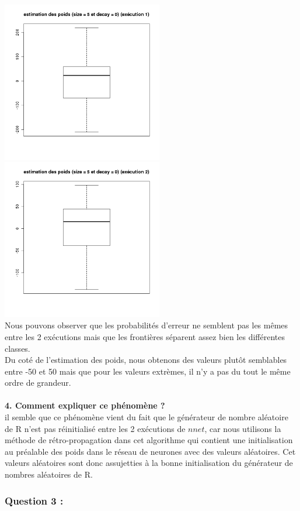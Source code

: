 \documentclass[a4paper, 10pt]{article}
\begin{document}
\includegraphics[height = 7cm, width = 7cm]{plots/poids_q2_2_3.png}
\includegraphics[height = 7cm, width = 7cm]{plots/poids_q2_3_2.png}\\
Nous pouvons observer que les probabilités d'erreur ne semblent pas les mêmes entre les 2 exécutions mais que les frontières séparent assez bien les différentes classes.\\
Du coté de l'estimation des poids, nous obtenons des valeurs plutôt semblables entre -50 et 50 mais que pour les valeurs extrèmes, il n'y a pas du tout le même ordre de grandeur.\\ \\
\textbf{4. Comment expliquer ce phénomène ?}\\
il semble que ce phénomène vient du fait que le générateur de nombre aléatoire de R n'est pas réinitialisé entre les 2 exécutions de $nnet$, car nous utilisons la méthode de rétro-propagation dans cet algorithme qui contient une initialisation au préalable des poids dans le réseau de neurones avec des valeurs aléatoires. Cet valeurs aléatoires sont donc assujetties à la bonne initialisation du générateur de nombres aléatoires de R.

\subsubsection*{Question 3 :}
\end{document}
